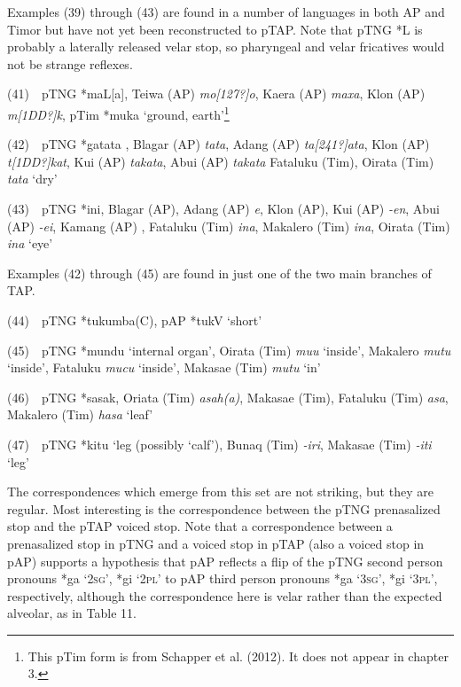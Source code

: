Examples (39) through (43) are found in a number of languages in both AP and Timor but have not yet been reconstructed to pTAP. Note that pTNG *L is probably a laterally released velar stop, so pharyngeal and velar fricatives would not be strange reflexes. 

(41)\ \ pTNG *maL[a], Teiwa (AP) \textit{mo[127?]o{\textglotstop}}, Kaera (AP) \textit{maxa}, Klon (AP) \textit{m[1DD?]k{\textepsilon}{\textglotstop}}, pTim *muka {\textquoteleft}ground, earth{\textquoteright}\footnote{ This pTim form is from Schapper et al. (2012). It does not appear in chapter 3. }

(42)\ \ pTNG *gatata , Blagar (AP) \textit{tata}, Adang (AP) \textit{ta}\textit{[241?]}\textit{ata}, Klon (AP) \textit{t}\textit{[1DD?]}\textit{kat}, Kui (AP) \textit{takata}, Abui (AP) \textit{takata} Fataluku (Tim), Oirata (Tim) \textit{tata} {\textquoteleft}dry{\textquoteright}

(43)\ \ pTNG *ini, Blagar (AP), Adang (AP) \textit{e{\ng}}, Klon (AP), Kui (AP) \textit{{}-en}, Abui (AP) \textit{{}-ei{\ng}}, Kamang (AP) \textit{{\ng}}, Fataluku (Tim) \textit{ina}, Makalero (Tim) \textit{ina}, Oirata (Tim) \textit{ina} {\textquoteleft}eye{\textquoteright}

Examples (42) through (45) are found in just one of the two main branches of TAP.

(44)\ \ pTNG *tukumba(C), pAP *tukV {\textquoteleft}short{\textquoteright}

(45)\ \ pTNG *mundu {\textquoteleft}internal organ{\textquoteright}, Oirata (Tim) \textit{mu{\textrtailt}u }{\textquoteleft}inside{\textquoteright}, Makalero \textit{mutu} {\textquoteleft}inside{\textquoteright}, Fataluku \textit{mucu }{\textquoteleft}inside{\textquoteright},\textit{ }Makasae (Tim) \textit{mutu }{\textquoteleft}in{\textquoteright}

(46)\ \ pTNG *sasak, Oriata (Tim) \textit{asah(a)}, Makasae (Tim), Fataluku (Tim) \textit{asa}, Makalero (Tim) \textit{hasa }{\textquoteleft}leaf{\textquoteright} 

(47)\ \ pTNG *kitu {\textquoteleft}leg (possibly {\textquoteleft}calf{\textquoteright}), Bunaq (Tim) \textit{{}-iri}, Makasae (Tim) \textit{{}-iti} {\textquoteleft}leg{\textquoteright}

The correspondences which emerge from this set are not striking, but they are regular. Most interesting is the correspondence between the pTNG prenasalized stop and the pTAP voiced stop. Note that a correspondence between a prenasalized stop in pTNG and a voiced stop in pTAP (also a voiced stop in pAP) supports a hypothesis that pAP reflects a flip of the pTNG second person pronouns *{\ng}ga {\textquoteleft}\textsc{2sg}{\textquoteright}, *{\ng}gi {\textquoteleft}\textsc{2pl}{\textquoteright} to pAP third person pronouns *ga {\textquoteleft}\textsc{3sg}{\textquoteright}, *gi {\textquoteleft}\textsc{3pl}{\textquoteright}, respectively, although the correspondence here is velar rather than the expected alveolar, as in Table 11.

